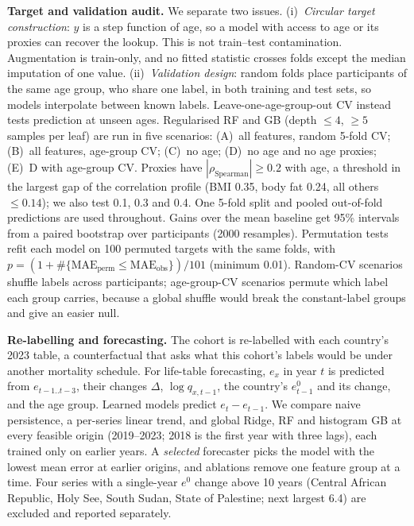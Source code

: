 \documentclass[runningheads]{llncs}
\begin{document}
\textbf{Target and validation audit.} We separate two issues. (i)~\emph{Circular target
construction}: $y$ is a step function of age, so a model with access to age or its proxies can
recover the lookup. This is not train--test contamination. Augmentation is train-only, and no
fitted statistic crosses folds except the median imputation of one value. (ii)~\emph{Validation
design}: random folds place participants of the same age group, who share one label, in both
training and test sets, so models interpolate between known labels. Leave-one-age-group-out CV
instead tests prediction at unseen ages. Regularised RF and GB (depth $\le4$, $\ge5$ samples per
leaf) are run in five scenarios: (A)~all features, random 5-fold CV; (B)~all features, age-group
CV; (C)~no age; (D)~no age and no age proxies; (E)~D with age-group CV. Proxies have
$|\rho_\text{Spearman}|\ge0.2$ with age, a threshold in the largest gap of the correlation profile
(BMI 0.35, body fat 0.24, all others $\le0.14$); we also test 0.1, 0.3 and 0.4. One 5-fold split
and pooled out-of-fold predictions are used throughout. Gains over the mean baseline get 95\%
intervals from a paired bootstrap over participants (2000 resamples). Permutation tests refit each
model on 100 permuted targets with the same folds, with
$p=(1+\#\{\text{MAE}_\text{perm}\le\text{MAE}_\text{obs}\})/101$ (minimum 0.01). Random-CV
scenarios shuffle labels across participants; age-group-CV scenarios permute which label each
group carries, because a global shuffle would break the constant-label groups and give an easier
null.

\textbf{Re-labelling and forecasting.} The cohort is re-labelled with each country's 2023 table,
a counterfactual that asks what this cohort's labels would be under another mortality schedule. For
life-table forecasting, $e_x$ in year $t$ is predicted from $e_{t-1..t-3}$, their changes
$\Delta$, $\log q_{x,t-1}$, the country's $e^0_{t-1}$ and its change, and the age group. Learned
models predict $e_t-e_{t-1}$. We compare naive persistence, a per-series linear trend, and global
Ridge, RF and histogram GB at every feasible origin (2019--2023; 2018 is the first year with three
lags), each trained only on earlier years. A \emph{selected} forecaster picks the model with the
lowest mean error at earlier origins, and ablations remove one feature group at a time. Four series
with a single-year $e^0$ change above 10 years (Central African Republic, Holy See, South Sudan,
State of Palestine; next largest 6.4) are excluded and reported separately.
\end{document}
